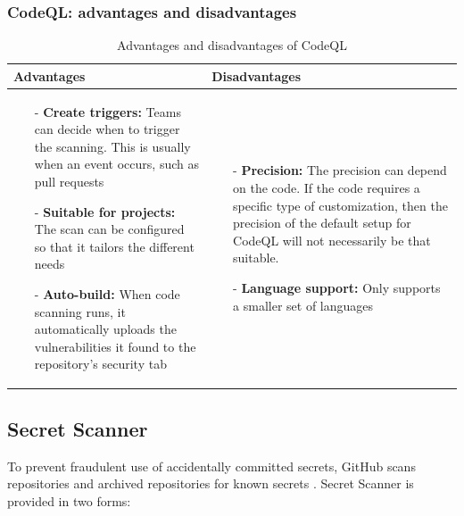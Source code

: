 \subsubsection{CodeQL: advantages and disadvantages}
\begin{table}[H]
\centering
\begin{tabular}{|>{\raggedright\arraybackslash}p{6cm}|>{\raggedright\arraybackslash}p{6cm}|}
\hline
\textbf{Advantages} & \textbf{Disadvantages} \\
\hline
\begin{itemize}
\item [-] \textbf{Create triggers:} Teams can decide when to trigger the scanning. This is usually when an event occurs, such as pull requests
\vspace{5pt}
\item [-]\textbf{Suitable for projects:} The scan can be configured so that it tailors the different needs
\vspace{5pt}
\item [-] \textbf{Auto-build:} When code scanning runs, it automatically uploads the vulnerabilities it found to the repository's security tab
\end{itemize}
&
   \begin{itemize}
\item [-]\textbf{Precision:} The precision can depend on the code. If the code requires a specific type of customization, then the precision of the default setup for CodeQL will not necessarily be that suitable. 
\vspace{5pt}
\item [-] \textbf{Language support:} Only supports a smaller set of languages 
\end{itemize}
\\
\hline
\end{tabular}
\caption{Advantages and disadvantages of CodeQL}
\label{tab: CodeQL}
\end{table}


\subsection{Secret Scanner}
To prevent fraudulent use of accidentally committed secrets, GitHub scans repositories and archived repositories for known secrets \cite{GithubSecretScanning}. Secret Scanner is provided in two forms:  

